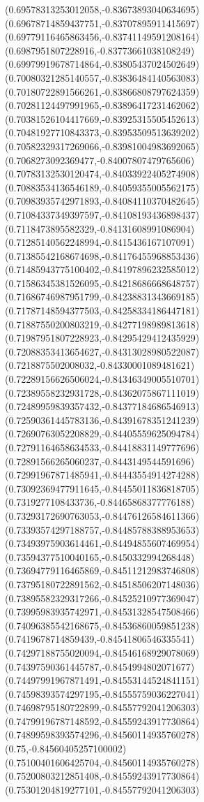 \documentclass[12pt]{article}
\theoremstyle{plain}
\theoremstyle{definition}
\theoremstyle{remark}
\begin{document}
\begin{figure}
{  (0.69578313253012058,-0.83673893040634695)%
  (0.69678714859437751,-0.83707895911415697)%
  (0.69779116465863456,-0.83741149591208164)%
  (0.6987951807228916,-0.83773661038108249)%
  (0.69979919678714864,-0.83805437024502649)%
  (0.70080321285140557,-0.83836484140563083)%
  (0.70180722891566261,-0.83866808797624359)%
  (0.70281124497991965,-0.83896417231462062)%
  (0.70381526104417669,-0.83925315505452613)%
  (0.70481927710843373,-0.83953509513639202)%
  (0.70582329317269066,-0.83981004983692065)%
  (0.7068273092369477,-0.84007807479765606)%
  (0.70783132530120474,-0.84033922405274908)%
  (0.70883534136546189,-0.84059355005562175)%
  (0.70983935742971893,-0.84084110370482645)%
  (0.71084337349397597,-0.84108193436898437)%
  (0.7118473895582329,-0.84131608991086904)%
  (0.71285140562248994,-0.8415436167107091)%
  (0.71385542168674698,-0.84176455968853436)%
  (0.71485943775100402,-0.84197896232585012)%
  (0.71586345381526095,-0.84218686668648757)%
  (0.71686746987951799,-0.84238831343669185)%
  (0.71787148594377503,-0.84258334186447181)%
  (0.71887550200803219,-0.84277198989813618)%
  (0.71987951807228923,-0.84295429412435929)%
  (0.72088353413654627,-0.84313028980522087)%
  (0.7218875502008032,-0.84330001089481621)%
  (0.72289156626506024,-0.84346349005510701)%
  (0.72389558232931728,-0.84362075867111019)%
  (0.72489959839357432,-0.84377184686546913)%
  (0.72590361445783136,-0.84391678351241239)%
  (0.72690763052208829,-0.84405559625094784)%
  (0.72791164658634533,-0.84418831149777696)%
  (0.72891566265060237,-0.8443149544591696)%
  (0.72991967871485941,-0.84443554914274288)%
  (0.73092369477911645,-0.84455011836818705)%
  (0.7319277108433736,-0.84465868377776188)%
  (0.73293172690763053,-0.84476126584611366)%
  (0.73393574297188757,-0.84485788388953653)%
  (0.73493975903614461,-0.84494855607469954)%
  (0.73594377510040165,-0.8450332994268448)%
  (0.73694779116465869,-0.84511212983746808)%
  (0.73795180722891562,-0.84518506207148036)%
  (0.73895582329317266,-0.84525210977369047)%
  (0.73995983935742971,-0.84531328547508466)%
  (0.74096385542168675,-0.84536860059851238)%
  (0.7419678714859439,-0.84541806546335541)%
  (0.74297188755020094,-0.84546168929078069)%
  (0.74397590361445787,-0.8454994802071677)%
  (0.74497991967871491,-0.84553144524841151)%
  (0.74598393574297195,-0.84555759036227041)%
  (0.74698795180722899,-0.84557792041206303)%
  (0.74799196787148592,-0.84559243917730864)%
  (0.74899598393574296,-0.84560114935760278)%
  (0.75,-0.84560405257100002)%
  (0.75100401606425704,-0.84560114935760278)%
  (0.75200803212851408,-0.84559243917730864)%
  (0.75301204819277101,-0.84557792041206303)%
}
\end{figure}
\end{document}

